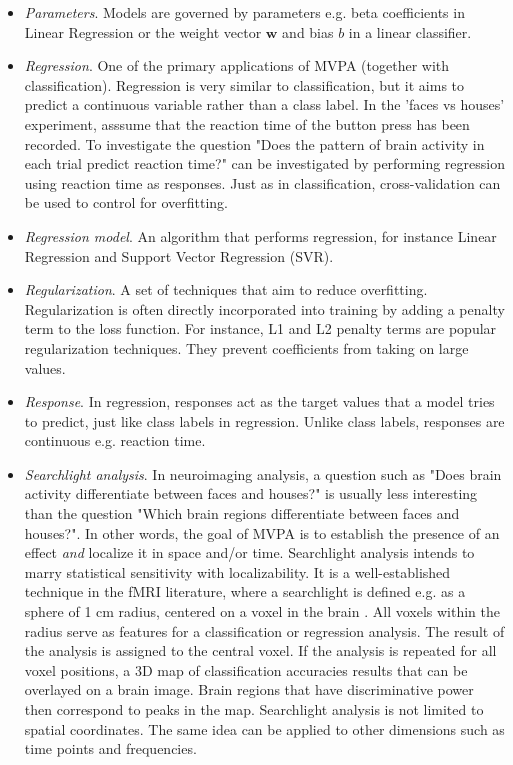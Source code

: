 \documentclass[utf8]{frontiersSCNS} %
\newcommand{\w}{\mathbf{w}}
\begin{document}
\begin{itemize}
\item \textit{Parameters}. Models are governed by parameters e.g. beta coefficients in Linear Regression or the weight vector $\w$ and bias $b$ in a linear classifier.
\item \textit{Regression}. One of the primary applications of MVPA (together with classification). Regression is very similar to classification, but it aims to predict a continuous variable rather than a  class label. In the 'faces vs houses' experiment, asssume that the reaction time of the button press has been recorded. To investigate the question "Does the pattern of brain activity in each trial predict reaction time?" can be investigated by performing regression using reaction time as responses. Just as in classification, cross-validation can be used to control for overfitting. 
\item \textit{Regression model}. An algorithm that performs regression, for instance Linear Regression and Support Vector Regression (SVR).
\item \textit{Regularization}. A set of techniques that aim to reduce overfitting. Regularization is often directly incorporated into training by adding a penalty term to the loss function. For instance, L1 and L2 penalty terms are popular regularization techniques. They prevent coefficients from taking on large values.
\item \textit{Response}. In regression, responses act as the target values that a model tries to predict, just like class labels in regression. Unlike class labels, responses are continuous e.g. reaction time.
\item\textit{Searchlight analysis}. In neuroimaging analysis, a question such as "Does brain activity differentiate between faces and houses?" is usually less interesting than the question "Which brain regions differentiate between faces and houses?". In other words, the goal of MVPA is to establish the presence of an effect \textit{and} localize it in space and/or time. Searchlight analysis intends to marry statistical sensitivity with localizability. It is a well-established technique in the fMRI literature, where a searchlight is defined e.g. as a sphere of 1 cm radius, centered on a voxel in the brain \citep{Kriegeskorte2006Information-basedMapping}. All voxels within the radius serve as features for a classification or regression analysis. The result of the analysis is assigned to the central voxel. If the analysis is repeated for all voxel positions, a 3D map of classification accuracies results that can be overlayed on a brain image. Brain regions that have discriminative power then correspond to peaks in the map. Searchlight analysis is not limited to spatial coordinates. The same idea can be applied to other dimensions such as time points and frequencies.

\end{itemize}
\end{document}
